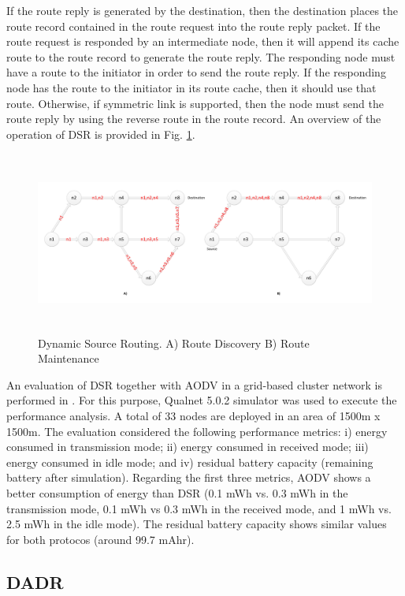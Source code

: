 \documentclass[11pt,draftclsnofoot,onecolumn]{IEEEtran}
\begin{document}
If the route reply is generated by the destination, then the destination places the route record contained in the route request into the route reply packet. If the route request is responded by an intermediate node, then it will append its cache route to the route record to generate the route reply. The responding node must have a route to the initiator in order to send the route reply. If the responding node has the route to the initiator in its route cache, then it should use that route. Otherwise, if symmetric link is supported, then the node must send the route reply by using the reverse route in the route record. An overview of the operation of DSR is provided in Fig. \ref{fig:dsrFigure}.

\begin{figure}[h!]
\centering
\includegraphics [height=6cm] {DSR}
\caption{Dynamic Source Routing. A) Route Discovery  B) Route Maintenance}
\label{fig:dsrFigure}
\end{figure}

An evaluation of DSR together with AODV in a grid-based cluster network is performed in \cite{PratibhaKevre2014}. For this purpose, Qualnet 5.0.2 simulator was used to execute the performance analysis. A total of 33 nodes are deployed in an area of 1500m x 1500m. The evaluation considered the following performance metrics: i) energy consumed in transmission mode; ii) energy consumed in received mode; iii)  energy consumed in idle mode; and iv) residual battery capacity (remaining battery after simulation). Regarding the first three metrics, AODV shows a better consumption of energy than DSR (0.1 mWh vs. 0.3 mWh in the transmission mode, 0.1 mWh vs 0.3 mWh in the received mode, and 1 mWh vs. 2.5 mWh in the idle mode).  The residual battery capacity shows similar values for both protocos (around 99.7 mAhr). 

\subsection{DADR}\label{dadr}
\end{document}
